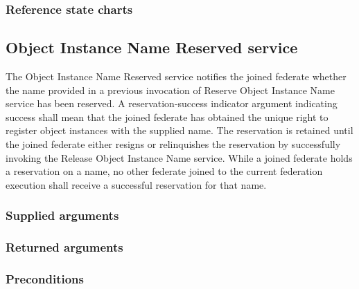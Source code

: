 \begin{compactstdpage}


    \subsubsection{Reference state charts}



    \subsection{Object Instance Name Reserved \rtiinitiated{} service}


    The Object Instance Name Reserved \rtiinitiated{} service notifies the joined federate whether the name provided in a previous invocation of Reserve Object Instance Name service has been reserved. A reservation-success indicator argument indicating success shall mean that the joined federate has obtained the unique right to register object instances with the supplied name. The reservation is retained until the joined federate either resigns or relinquishes the reservation by successfully invoking the Release Object Instance Name service. While a joined federate holds a reservation on a name, no other federate joined to the current federation execution shall receive a successful reservation for that name.

    \subsubsection{Supplied arguments}



    \subsubsection{Returned arguments}



    \subsubsection{Preconditions}



\end{compactstdpage}
